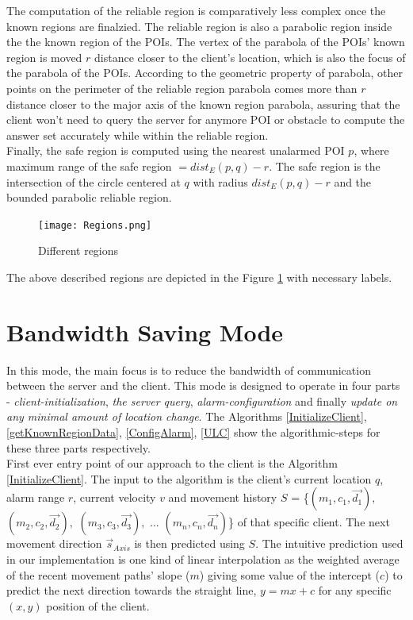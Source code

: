 The computation of the reliable region is comparatively less complex once the known regions are finalzied. The reliable region is also a parabolic region inside the the known region of the POIs. The vertex of the parabola of the POIs' known region is moved $r$ distance closer to the client's location, which is also the focus of the parabola of the POIs. According to the geometric property of parabola, other points on the perimeter of the reliable region parabola comes more than $r$ distance closer to the major axis of the known region parabola, assuring that the client won't need to query the server for anymore POI or obstacle to compute the answer set accurately while within the reliable region.\\

Finally, the safe region is computed using the nearest unalarmed POI $p$, where maximum range of the safe region $ = dist_E(p,q) - r$. The safe region is the intersection of the circle centered at $q$ with radius $dist_E(p,q)-r$ and the bounded parabolic reliable region.

\begin{figure}[h]
  \texttt{[image: Regions.png]}
  \caption{Different regions}
  \label{fig:regions}
\end{figure}

The above described regions are depicted in the Figure \ref{fig:regions} with necessary labels.


\section{Bandwidth Saving Mode}
\label{BWS}
In this mode, the main focus is to reduce the bandwidth of communication between the server and the client. This mode is designed to operate in four parts - \textit{client-initialization}, \textit{the server query}, \textit{alarm-configuration} and finally \textit{update on any minimal amount of location change}. The Algorithms \ref{InitializeClient}, \ref{getKnownRegionData}, \ref{ConfigAlarm}, \ref{ULC} show the algorithmic-steps for these three parts respectively.\\


First ever entry point of our approach to the client is the Algorithm \ref{InitializeClient}. The input to the algorithm is the client's current location $q$, alarm range $r$, current velocity $v$ and movement history $S$ = \{$(m_1, c_1, \vec{d_1}),$ $(m_2, c_2, \vec{d_2}),$ $(m_3, c_3, \vec{d_3}),$ ... $(m_n, c_n, \vec{d_n})$\}  of that specific client. The next movement direction $\vec{s}_{Axis}$ is then predicted using $S$. The intuitive prediction used in our implementation is one kind of linear interpolation as the weighted average of the recent movement paths' slope ($m$) giving some value of the intercept ($c$) to predict the next direction towards the straight line, $y=mx+c$ for any specific $(x,y)$ position of the client.\\

